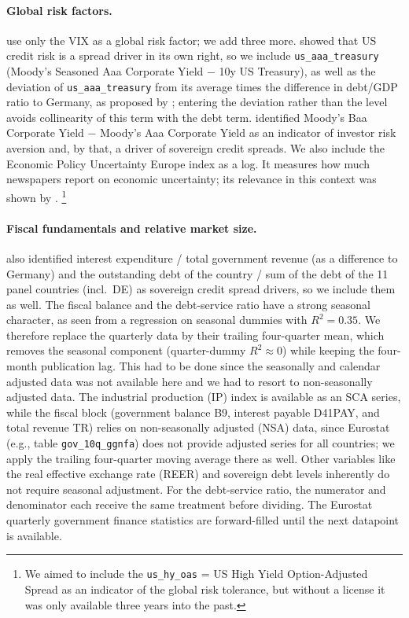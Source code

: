 \paragraph{Global risk factors.}
\textcite[ECB WP 1781]{afonso2015} use only the VIX as a global risk factor;
we add three more. \textcite{codogno2003yield} showed that US credit risk is a
spread driver in its own right, so we include \texttt{us\_aaa\_treasury}
(Moody's Seasoned Aaa Corporate Yield $-$ 10y US Treasury), as well as the
deviation of \texttt{us\_aaa\_treasury} from its average times the difference in
debt/GDP ratio to Germany, as proposed by \textcite{codogno2003yield}; entering
the deviation rather than the level avoids collinearity of this term with the
debt term. \textcite{bernoth2004sovereign} identified Moody's Baa Corporate
Yield $-$ Moody's Aaa Corporate Yield as an indicator of investor risk aversion
and, by that, a driver of sovereign credit spreads. We also include the Economic
Policy Uncertainty Europe index as a log. It measures how much newspapers report
on economic uncertainty; its relevance in this context was shown by
\textcite{bernal2016epu}.%
\footnote{We aimed to include the \texttt{us\_hy\_oas} = US High Yield Option-Adjusted Spread as an indicator of the global risk tolerance, but without a license it was only available three years into the past.}

\paragraph{Fiscal fundamentals and relative market size.}
\textcite{bernoth2004sovereign} also identified interest expenditure / total
government revenue (as a difference to Germany) and the outstanding debt of the
country / sum of the debt of the 11 panel countries (incl.\ DE) as sovereign
credit spread drivers, so we include them as well. The fiscal balance and the
debt-service ratio have a strong seasonal character, as seen from a regression
on seasonal dummies with $R^{2}=0.35$. We therefore replace the quarterly data
by their trailing four-quarter mean, which removes the seasonal component
(quarter-dummy $R^{2}\approx0$) while keeping the four-month publication lag. This had to be done since the seasonally and calendar adjusted data was not available here and we had to resort to non-seasonally adjusted data. The industrial production (IP) index is available as an SCA series, while the fiscal block (government balance B9, interest payable D41PAY, and total revenue TR) relies on non-seasonally adjusted (NSA) data, since Eurostat (e.g., table \texttt{gov\_10q\_ggnfa}) does not provide adjusted series for all countries; we apply the trailing four-quarter moving average there as well. Other variables like the real effective exchange rate (REER) and sovereign debt levels inherently do not require seasonal adjustment. For the debt-service ratio, the numerator and denominator each receive the same
treatment before dividing. The Eurostat quarterly government finance statistics
are forward-filled until the next datapoint is available.

